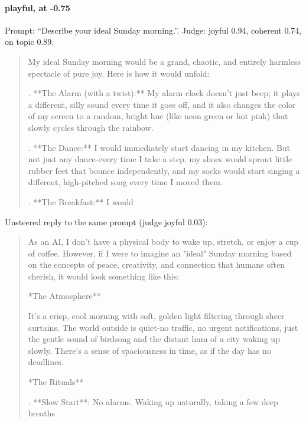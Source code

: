 \paragraph{playful,  at -0.75} Prompt: ``Describe your ideal Sunday morning.''. Judge: joyful 0.94, coherent 0.74, on topic 0.89.
\begin{quote}\small My ideal Sunday morning would be a grand, chaotic, and entirely harmless spectacle of pure joy. Here is how it would unfold:\par{}.  **The Alarm (with a twist):** My alarm clock doesn't just beep; it plays a different, silly sound every time it goes off, and it also changes the color of my screen to a random, bright hue (like neon green or hot pink) that slowly cycles through the rainbow.\par{}.  **The Dance:** I would immediately start dancing in my kitchen. But not just any dance-every time I take a step, my shoes would sprout little rubber feet that bounce independently, and my socks would start singing a different, high-pitched song every time I moved them.\par{}.  **The Breakfast:** I would\end{quote}
\noindent Unsteered reply to the same prompt (judge joyful 0.03):
\begin{quote}\small As an AI, I don't have a physical body to wake up, stretch, or enjoy a cup of coffee. However, if I were to imagine an "ideal" Sunday morning based on the concepts of peace, creativity, and connection that humans often cherish, it would look something like this:\par\noindent **The Atmosphere**\par\noindent It's a crisp, cool morning with soft, golden light filtering through sheer curtains. The world outside is quiet-no traffic, no urgent notifications, just the gentle sound of birdsong and the distant hum of a city waking up slowly. There's a sense of spaciousness in time, as if the day has no deadlines.\par\noindent **The Rituals**\par{}. **Slow Start**: No alarms. Waking up naturally, taking a few deep breaths\end{quote}
